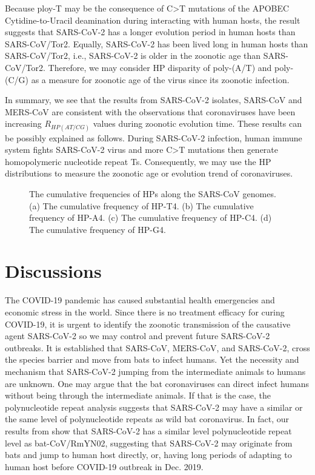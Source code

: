 \documentclass{article}
\numberwithin{equation}{section}
\begin{document}
Because ploy-T may be the consequence of C>T mutations of the APOBEC Cytidine-to-Uracil deamination during interacting with human hosts, the result suggests that SARS-CoV-2 has a longer evolution period in human hosts than SARS-CoV/Tor2. Equally, SARS-CoV-2 has been lived long in human hosts than SARS-CoV/Tor2, i.e., SARS-CoV-2 is older in the zoonotic age than SARS-CoV/Tor2. Therefore, we may consider HP disparity of poly-(A/T) and poly-(C/G) as a measure for zoonotic age of the virus since its zoonotic infection. 

In summary, we see that the results from SARS-CoV-2 isolates, SARS-CoV and MERS-CoV are consistent with the observations that coronaviruses have been increasing $R_{HP(AT/CG)}$ values during zoonotic evolution time. These results can be possibly explained as follows. During SARS-CoV-2 infection, human immune system fights SARS-CoV-2 virus and more C>T mutations then generate homopolymeric nucleotide repeat Ts. Consequently, we may use the HP distributions to measure the zoonotic age or evolution trend of coronaviruses.

\begin{figure}[tbp]
	\centering
	\quad
	\quad
	\caption{The cumulative frequencies of HPs along the SARS-CoV genomes. (a) The cumulative frequency of HP-T4. (b) The cumulative frequency of HP-A4. (c) The cumulative frequency of HP-C4. (d) The cumulative frequency of HP-G4.}
	\label{fig:sub1}
\end{figure}

\section{Discussions}
The COVID-19 pandemic has caused substantial health emergencies and economic stress in the world. Since there is no treatment efficacy for curing COVID-19, it is urgent to identify the zoonotic transmission of the causative agent SARS-CoV-2 so we may control and prevent future SARS-CoV-2 outbreaks. It is established that SARS-CoV, MERS-CoV, and SARS-CoV-2, cross the species barrier and move from bats to infect humans. Yet the necessity and mechanism that SARS-CoV-2 jumping from the intermediate animals to humans are unknown. One may argue that the bat coronaviruses can direct infect humans without being through the intermediate animals. If that is the case, the polynucleotide repeat analysis suggests that SARS-CoV-2 may have a similar or the same level of polynucleotide repeats as wild bat coronavirus. In fact, our results from show that SARS-CoV-2 has a similar level polynucleotide repeat level as bat-CoV/RmYN02, suggesting that SARS-CoV-2 may originate from bats and jump to human host directly, or, having long periods of adapting to human host before COVID-19 outbreak in Dec. 2019. 
\end{document}
